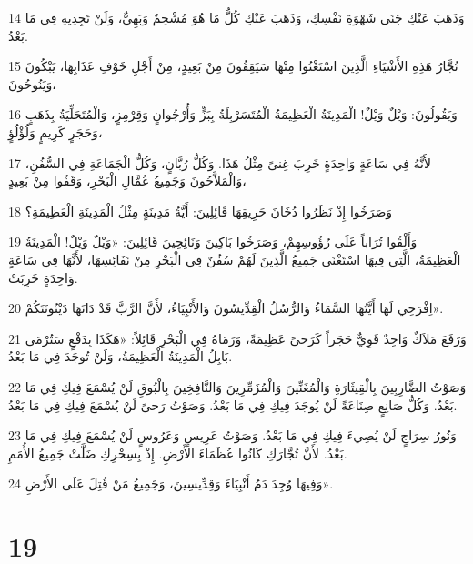 \par 14 وَذَهَبَ عَنْكِ جَنَى شَهْوَةِ نَفْسِكِ، وَذَهَبَ عَنْكِ كُلُّ مَا هُوَ مُشْحِمٌ وَبَهِيٌّ، وَلَنْ تَجِدِيهِ فِي مَا بَعْدُ.
\par 15 تُجَّارُ هَذِهِ الأَشْيَاءِ الَّذِينَ اسْتَغْنُوا مِنْهَا سَيَقِفُونَ مِنْ بَعِيدٍ، مِنْ أَجْلِ خَوْفِ عَذَابِهَا، يَبْكُونَ وَيَنُوحُونَ،
\par 16 وَيَقُولُونَ: وَيْلٌ وَيْلٌ! الْمَدِينَةُ الْعَظِيمَةُ الْمُتَسَرْبِلَةُ بِبَزٍّ وَأُرْجُوانٍ وَقِرْمِزٍ، وَالْمُتَحَلِّيَةُ بِذَهَبٍ وَحَجَرٍ كَرِيمٍ وَلُؤْلُؤٍ،
\par 17 لأَنَّهُ فِي سَاعَةٍ وَاحِدَةٍ خَرِبَ غِنىً مِثْلُ هَذَا. وَكُلُّ رُبَّانٍ، وَكُلُّ الْجَمَاعَةِ فِي السُّفُنِ، وَالْمَلاَّحُونَ وَجَمِيعُ عُمَّالِ الْبَحْرِ، وَقَفُوا مِنْ بَعِيدٍ،
\par 18 وَصَرَخُوا إِذْ نَظَرُوا دُخَانَ حَرِيقِهَا قَائِلِينَ: أَيَّةُ مَدِينَةٍ مِثْلُ الْمَدِينَةِ الْعَظِيمَةِ؟
\par 19 وَأَلْقُوا تُرَاباً عَلَى رُؤُوسِهِمْ، وَصَرَخُوا بَاكِينَ وَنَائِحِينَ قَائِلِينَ: «وَيْلٌ وَيْلٌ! الْمَدِينَةُ الْعَظِيمَةُ، الَّتِي فِيهَا اسْتَغْنَى جَمِيعُ الَّذِينَ لَهُمْ سُفُنٌ فِي الْبَحْرِ مِنْ نَفَائِسِهَا، لأَنَّهَا فِي سَاعَةٍ وَاحِدَةٍ خَرِبَتْ.
\par 20 اِفْرَحِي لَهَا أَيَّتُهَا السَّمَاءُ وَالرُّسُلُ الْقِدِّيسُونَ وَالأَنْبِيَاءُ، لأَنَّ الرَّبَّ قَدْ دَانَهَا دَيْنُونَتَكُمْ».
\par 21 وَرَفَعَ مَلاَكٌ وَاحِدٌ قَوِيٌّ حَجَراً كَرَحىً عَظِيمَةً، وَرَمَاهُ فِي الْبَحْرِ قَائِلاً: «هَكَذَا بِدَفْعٍ سَتُرْمَى بَابِلُ الْمَدِينَةُ الْعَظِيمَةُ، وَلَنْ تُوجَدَ فِي مَا بَعْدُ.
\par 22 وَصَوْتُ الضَّارِبِينَ بِالْقِيثَارَةِ وَالْمُغَنِّينَ وَالْمُزَمِّرِينَ وَالنَّافِخِينَ بِالْبُوقِ لَنْ يُسْمَعَ فِيكِ فِي مَا بَعْدُ. وَكُلُّ صَانِعٍ صِنَاعَةً لَنْ يُوجَدَ فِيكِ فِي مَا بَعْدُ. وَصَوْتُ رَحىً لَنْ يُسْمَعَ فِيكِ فِي مَا بَعْدُ.
\par 23 وَنُورُ سِرَاجٍ لَنْ يُضِيءَ فِيكِ فِي مَا بَعْدُ. وَصَوْتُ عَرِيسٍ وَعَرُوسٍ لَنْ يُسْمَعَ فِيكِ فِي مَا بَعْدُ. لأَنَّ تُجَّارَكِ كَانُوا عُظَمَاءَ الأَرْضِ. إِذْ بِسِحْرِكِ ضَلَّتْ جَمِيعُ الأُمَمِ.
\par 24 وَفِيهَا وُجِدَ دَمُ أَنْبِيَاءَ وَقِدِّيسِينَ، وَجَمِيعُ مَنْ قُتِلَ عَلَى الأَرْضِ».

\chapter{19}

